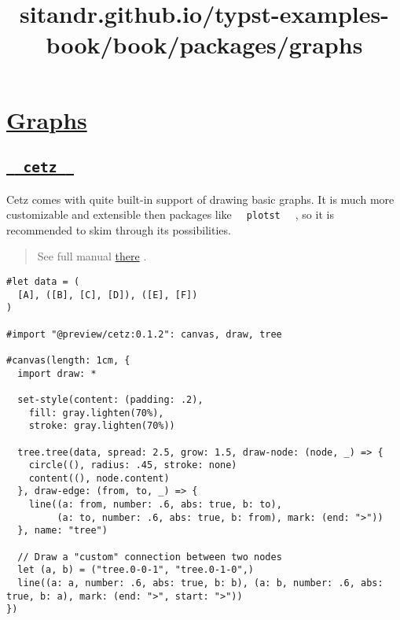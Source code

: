 \title{sitandr.github.io/typst-examples-book/book/packages/graphs}

\section{\texorpdfstring{\hyperref[graphs]{Graphs}}{Graphs}}\label{graphs}

\subsection{\texorpdfstring{\hyperref[cetz]{\texttt{\ }{\texttt{\ cetz\ }}\texttt{\ }}}{  cetz  }}\label{cetz}

Cetz comes with quite built-in support of drawing basic graphs. It is
much more customizable and extensible then packages like
\texttt{\ }{\texttt{\ plotst\ }}\texttt{\ } , so it is recommended to
skim through its possibilities.

\begin{quote}
See full manual
\href{https://github.com/johannes-wolf/cetz/blob/master/manual.pdf?raw=true}{there}
.
\end{quote}

\begin{verbatim}
#let data = (
  [A], ([B], [C], [D]), ([E], [F])
)

#import "@preview/cetz:0.1.2": canvas, draw, tree

#canvas(length: 1cm, {
  import draw: *

  set-style(content: (padding: .2),
    fill: gray.lighten(70%),
    stroke: gray.lighten(70%))

  tree.tree(data, spread: 2.5, grow: 1.5, draw-node: (node, _) => {
    circle((), radius: .45, stroke: none)
    content((), node.content)
  }, draw-edge: (from, to, _) => {
    line((a: from, number: .6, abs: true, b: to),
         (a: to, number: .6, abs: true, b: from), mark: (end: ">"))
  }, name: "tree")

  // Draw a "custom" connection between two nodes
  let (a, b) = ("tree.0-0-1", "tree.0-1-0",)
  line((a: a, number: .6, abs: true, b: b), (a: b, number: .6, abs: true, b: a), mark: (end: ">", start: ">"))
})
\end{verbatim}

\pandocbounded{}


